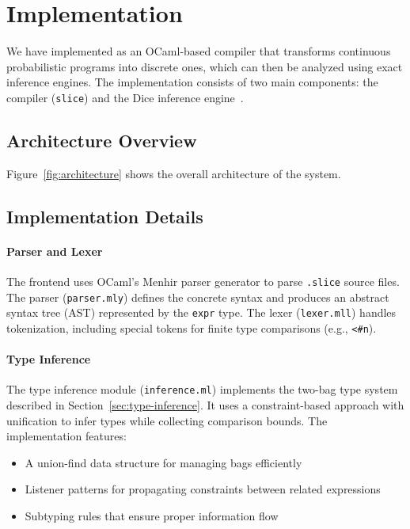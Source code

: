 \section{Implementation}\label{sec:implementation}

We have implemented \Slice{} as an OCaml-based compiler that transforms continuous probabilistic programs into discrete ones, which can then be analyzed using exact inference engines. The implementation consists of two main components: the \Slice{} compiler (\texttt{slice}) and the Dice inference engine~\cite{Holtzen2020Dice}.

\subsection{Architecture Overview}

Figure~\ref{fig:architecture} shows the overall architecture of the \Slice{} system.



\subsection{Implementation Details}

\paragraph{Parser and Lexer} The frontend uses OCaml's Menhir parser generator to parse \texttt{.slice} source files. The parser (\texttt{parser.mly}) defines the concrete syntax and produces an abstract syntax tree (AST) represented by the \texttt{expr} type. The lexer (\texttt{lexer.mll}) handles tokenization, including special tokens for finite type comparisons (e.g., \texttt{<\#n}).

\paragraph{Type Inference} The type inference module (\texttt{inference.ml}) implements the two-bag type system described in Section~\ref{sec:type-inference}. It uses a constraint-based approach with unification to infer types while collecting comparison bounds. The implementation features:
\begin{itemize}
    \item A union-find data structure for managing bags efficiently
    \item Listener patterns for propagating constraints between related expressions
    \item Subtyping rules that ensure proper information flow
\end{itemize}

